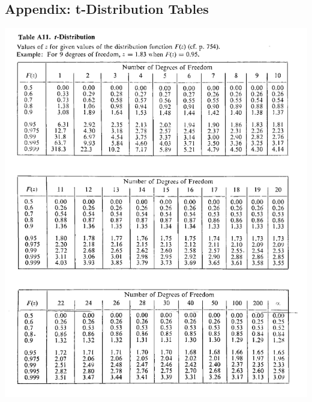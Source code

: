 \documentclass{article}
\begin{document}
\newpage
\begin{appendices}
\pagestyle{fancy}
\renewcommand{\thefigure}{A\arabic{figure}}
\setcounter{figure}{0}

\section*{Appendix: t-Distribution Tables}
\includegraphics[width=\textwidth]{t_distribution_Table_lecture3.png}
\end{appendices}
\end{document}
